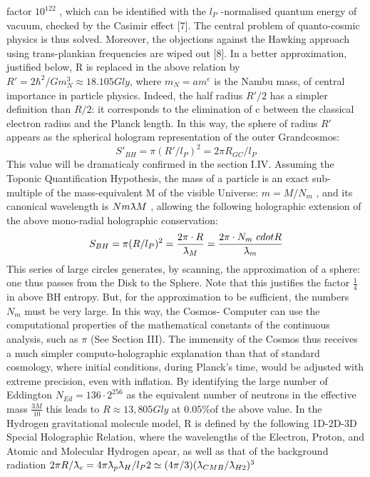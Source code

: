factor $10^{122}$ , which can be identified with the $l_{P}$ -normalised quantum energy of vacuum, checked by
the Casimir effect [7]. The central problem of quanto-cosmic physics is thus solved. Moreover, the
objections against the Hawking approach using trans-plankian frequencies are wiped out [8].
In a better approximation, justified below, R is replaced in the above relation by $R\prime = 2\hbar^{2}/Gm_{N}^{3}
\approx 18.105 Gly$, where $m_{N} = am^{e}$ is the Nambu mass, of central importance in particle
physics. Indeed, the half radius $R\prime/2$ has a simpler definition than $R/2$: it corresponds to the
elimination of c between the classical electron radius and the Planck length. In this way, the sphere
of radius $R\prime$ appears as the spherical hologram representation of the outer Grandcosmos:
$$S\prime_{BH} = \pi(R\prime/l_{P} )^{2} = 2\pi R_{GC} /l_{P}$$
This value will be dramaticaly confirmed in the section I.IV.
Assuming the Toponic Quantification Hypothesis, the mass of a particle is an exact sub-multiple
of the mass-equivalent M of the visible Universe: $m = M/N_{m}$ , and its canonical wavelength is $N m \lambdabar M$ ,
allowing the following holographic extension of the above mono-radial holographic conservation:
$$S_{BH} = \pi(R/l_{P})^{2} = \frac{2\pi \cdot R}{\lambdabar_{M}} = \frac{2\pi \cdot N_{m}\ cdot R}{\lambdabar_{m}}$$
This series of large circles generates, by scanning, the approximation of a sphere: one thus passes
from the Disk to the Sphere. Note that this justifies the factor $\frac{1}{4}$ in above BH entropy. But, for
the approximation to be sufficient, the numbers $N_{m}$ must be very large. In this way, the Cosmos-
Computer can use the computational properties of the mathematical constants of the continuous
analysis, such as $\pi$ (See Section III).
The immensity of the Cosmos thus receives a much simpler computo-holographic explanation than
that of standard cosmology, where initial conditions, during Planck's time, would be adjusted with
extreme precision, even with inflation. By identifying the large number of Eddington $N_{Ed} = 136 \cdot
2^{256}$ as the equivalent number of neutrons in the effective mass $\frac{3M}{10}$ this leads to $R \approx 13,805
Gly$ at $0.05\%$of the above value.
In the Hydrogen gravitational molecule model, R is defined by the following 1D-2D-3D Special
Holographic Relation, where the wavelengths of the Electron, Proton, and Atomic and Molecular
Hydrogen apear, as well as that of the background radiation
$2 \pi R/\lambdabar_{e} = 4 \pi \lambdabar_{p} \lambdabar_{H} /l_{P} 2 \simeq (4\pi/3)(\lambdabar_{CMB} /\lambdabar_{H2})^{3}$
